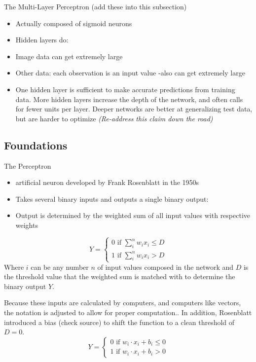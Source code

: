 The Multi-Layer Perceptron (add these into this subsection)

\begin{itemize}
\tightlist
\item
  Actually composed of sigmoid neurons

\item
Hidden layers do:

\item
Image data can get extremely large

\item
  Other data: each observation is an input value -also can get extremely large
  
\item
  One hidden layer is sufficient to make accurate predictions from
  training data. More hidden layers increase the depth of the network,
  and often calls for fewer units per layer. Deeper networks are better
  at generalizing test data, but are harder to optimize
  \cite{Goodfellow-et-al-2016} \emph{(Re-address this claim down the
  road)}
\end{itemize}

\hypertarget{foundations}{%
\subsection{Foundations}\label{foundations}}

The Perceptron

\begin{itemize}
\tightlist
\item
  artificial neuron developed by Frank Rosenblatt in the 1950s
  \cite{nielsen}
\item
  Takes several binary inputs and outputs a single binary output:
\item
  Output is determined by the weighted sum of all input values with
  respective weights
\end{itemize}

\[
Y = 
\begin{cases}
0 \text{ if } \sum_i^n w_ix_i \le D \\
1 \text{ if } \sum_i^n w_ix_i > D
\end{cases}
\] Where \(i\) can be any number \(n\) of input values composed in the
network and \(D\) is the threshold value that the weighted sum is
matched with to determine the binary output \(Y\).

Because these inputs are calculated by computers, and computers like
vectors, the notation is adjusted to allow for proper computation.. In
addition, Rosenblatt introduced a bias (check source) to shift the
function to a clean threshold of \(D = 0\). \[
Y = 
\begin{cases}
0 \text{ if } w_i \cdot x_i + b_i \le 0 \\
1 \text{ if } w_i \cdot x_i + b_i > 0
\end{cases}
\]

